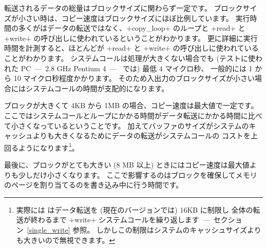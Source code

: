 転送されるデータの総量はブロックサイズに関わらず一定です。
ブロックサイズが小さい時は、コピー速度はブロックサイズにほぼ比例しています。
実行時間の多くがはデータの転送ではなく、\ml+copy_loop+ のループと
\ml+read+ と \ml+write+ の呼び出しに使われているということがわかります。
更に詳細に実行時間を計測すると、ほとんどが \ml+read+ と \ml+write+ の呼び出しに使われていることがわかります。
システムコールは処理が大きくない場合でも (テストに使われた PC~---~2.8 GHz Pentium 4~---~ では) 最低 4 マイクロ秒、
一般的には 1 から 10 マイクロ秒程度かかります。
そのため入出力のブロックサイズが小さい場合にはシステムコールの時間が支配的になります。

ブロックが大きくて 4KB から 1MB の場合、コピー速度は最大値で一定です。
ここではシステムコールとループにかかる時間がデータ転送にかかる時間に比べて小さくなっているということです。
加えてバッファのサイズがシステムのキャッシュよりも大きくなるためにデータの転送がシステムコールの
コストを上回るようになります\footnote{実際には \ocaml はデータ転送を (現在のバージョンでは) 16KB に制限し
  全体の転送が終わるまで \ml+write+ システムコールを繰り返します~---~セクション~\ref{single_write} 参照。
  しかしこの制限はシステムのキャッシュサイズよりも大きいので無視できます。}。

最後に、ブロックがとても大きい (8 MB 以上) ときにはコピー速度は最大値よりも少しだけ小さくなります。
ここで影響するのはブロックを確保してメモリのページを割り当てるのを書き込み中に行う時間です。

